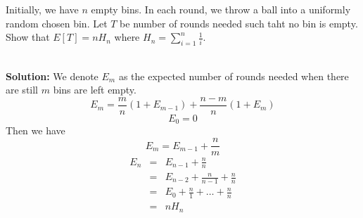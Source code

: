 \section{}
Initially, we have $n$ empty bins. In each round, we throw a ball into a uniformly random chosen bin. Let $T$ be number of rounds needed such taht no bin is empty. Show that $E[T]=nH_n$ where $H_n = \sum_{i=1}^n\frac{1}{i}$.

\ \\{\bf Solution:} We denote $E_m$ as the expected number of rounds needed when there are still $m$ bins are left empty.
\[
E_m = \frac{m}{n} (1+E_{m-1}) + \frac{n-m}{n} (1+E_m)
\]
\[
E_0 = 0
\]
Then we have
\[
E_m = E_{m-1} + \frac{n}{m}
\]
\begin{eqnarray*}
E_n &=& E_{n-1} + \frac{n}{n} \\
&=& E_{n-2} + \frac{n}{n-1} + \frac{n}{n}\\
&=& E_0 + \frac{n}{1} + \dots + \frac{n}{n} \\
&=& n H_n
\end{eqnarray*}